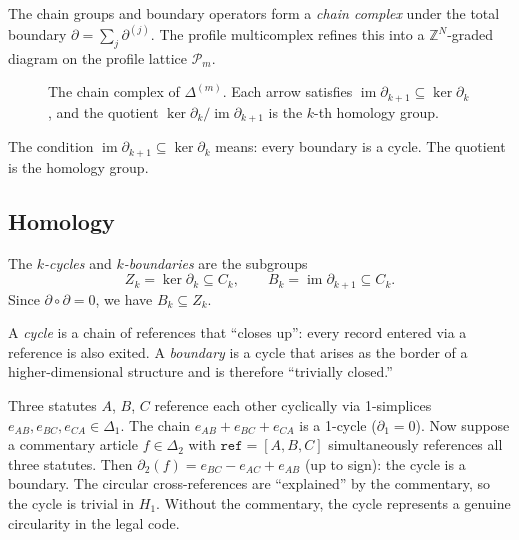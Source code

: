 The chain groups and boundary operators form a \emph{chain complex} under the total boundary $\partial = \sum_j \partial^{(j)}$. The profile multicomplex refines this into a $\mathbb{Z}^N$-graded diagram on the profile lattice $\mathcal{P}_m$.

\begin{figure}[ht]
\centering
{}
\caption{The chain complex of $\Delta^{(m)}$. Each arrow satisfies $\operatorname{im} \partial_{k+1} \subseteq \ker \partial_k$, and the quotient $\ker \partial_k / \operatorname{im} \partial_{k+1}$ is the $k$-th homology group.}
\label{fig:chain-complex}
\end{figure}

The condition $\operatorname{im} \partial_{k+1} \subseteq \ker \partial_k$ means: every boundary is a cycle. The quotient is the homology group.


\subsection{Homology}

\begin{definition}
\label{def:cycles-boundaries}
The \emph{$k$-cycles} and \emph{$k$-boundaries} are the subgroups
\[
Z_k = \ker \partial_k \subseteq C_k, \qquad B_k = \operatorname{im} \partial_{k+1} \subseteq C_k.
\]
Since $\partial \circ \partial = 0$, we have $B_k \subseteq Z_k$.
\end{definition}

A \emph{cycle} is a chain of references that ``closes up'': every record entered via a reference is also exited. A \emph{boundary} is a cycle that arises as the border of a higher-dimensional structure and is therefore ``trivially closed.''

\begin{example}
Three statutes $A$, $B$, $C$ reference each other cyclically via 1-simplices $e_{AB}, e_{BC}, e_{CA} \in \Delta_1$. The chain $e_{AB} + e_{BC} + e_{CA}$ is a 1-cycle ($\partial_1 = 0$). Now suppose a commentary article $f \in \Delta_2$ with $\texttt{ref} = [A, B, C]$ simultaneously references all three statutes. Then $\partial_2(f) = e_{BC} - e_{AC} + e_{AB}$ (up to sign): the cycle is a boundary. The circular cross-references are ``explained'' by the commentary, so the cycle is trivial in $H_1$. Without the commentary, the cycle represents a genuine circularity in the legal code.
\end{example}

